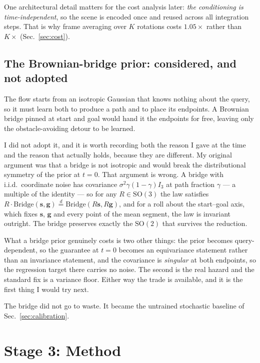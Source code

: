 \documentclass[11pt,a4paper]{article}
\newcommand{\svec}{\mathbf{s}}
\newcommand{\gvec}{\mathbf{g}}
\newcommand{\SO}{\mathrm{SO}}
\begin{document}
One architectural detail matters for the cost analysis later: \emph{the
conditioning is time-independent}, so the scene is encoded once and reused across
all integration steps. That is why frame averaging over $K$ rotations costs
$1.05\times$ rather than $K\times$ (Sec.~\ref{sec:cost}).

\subsection{The Brownian-bridge prior: considered, and not adopted}
\label{sec:bridge}

The flow starts from an isotropic Gaussian that knows nothing about the query, so
it must learn both to produce a path and to place its endpoints. A Brownian
bridge pinned at start and goal would hand it the endpoints for free, leaving
only the obstacle-avoiding detour to be learned.

I did not adopt it, and it is worth recording both the reason I gave at the time
and the reason that actually holds, because they are different. My original
argument was that a bridge is not isotropic and would break the distributional
symmetry of the prior at $t=0$. That argument is wrong. A bridge with i.i.d.\
coordinate noise has covariance $\sigma^2 \gamma(1-\gamma) I_3$ at path fraction
$\gamma$ --- a multiple of the identity --- so for any $R \in \SO(3)$ the law
satisfies $R \cdot \mathrm{Bridge}(\svec,\gvec) \overset{d}{=}
\mathrm{Bridge}(R\svec, R\gvec)$, and for a roll about the start--goal axis,
which fixes $\svec$, $\gvec$ and every point of the mean segment, the law is
invariant outright. The bridge preserves exactly the $\mathrm{SO}(2)$ that
survives the reduction.

What a bridge prior genuinely costs is two other things: the prior becomes
query-dependent, so the guarantee at $t=0$ becomes an equivariance statement
rather than an invariance statement, and the covariance is \emph{singular} at
both endpoints, so the regression target there carries no noise. The second is
the real hazard and the standard fix is a variance floor. Either way the trade is
available, and it is the first thing I would try next.

The bridge did not go to waste. It became the untrained stochastic baseline of
Sec.~\ref{sec:calibration}.

\section{Stage 3: Method}
\label{sec:method}
\end{document}
